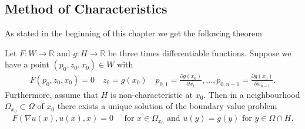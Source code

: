\subsection{Method of Characteristics}
As stated in the beginning of this chapter we get the following theorem 
\begin{Theorem}[1.9.]
 Let $F : W\to \mathbb{R}$  and $g : H \to \mathbb{R}$ be three times differentiable functions.
 Suppose we have a point $(p_{0},z_{0},x_{0}) \in  W$ with 
 \begin{align*}
   F(p_{0},z_{0},x_{0}) = 0 \quad z_{0} = g(x_{0}) \quad p_{0,1} = \frac{\partial g(x_{0})}{\partial x_{1}}  ,\ldots ,p_{0,n-1} = \frac{\partial g(x_{0})}{\partial x_{n-1}} 
 .\end{align*}
 Furthermore, assume that $H$ is non-characteristic at $x_{0}$. Then in a neighbourhood $\Omega_{x_{0}} \subset  \Omega $
 of $x_{0}$ there exists a unique solution of the boundary value problem 
 \begin{align*}
   F(\nabla u (x),u(x),x) = 0  \quad \text{ for } x \in  \Omega_{x_{0}} \text{ and } u(y) = g(y) \text{ for } y \in  \Omega  \cap H
 .\end{align*}
\end{Theorem}

